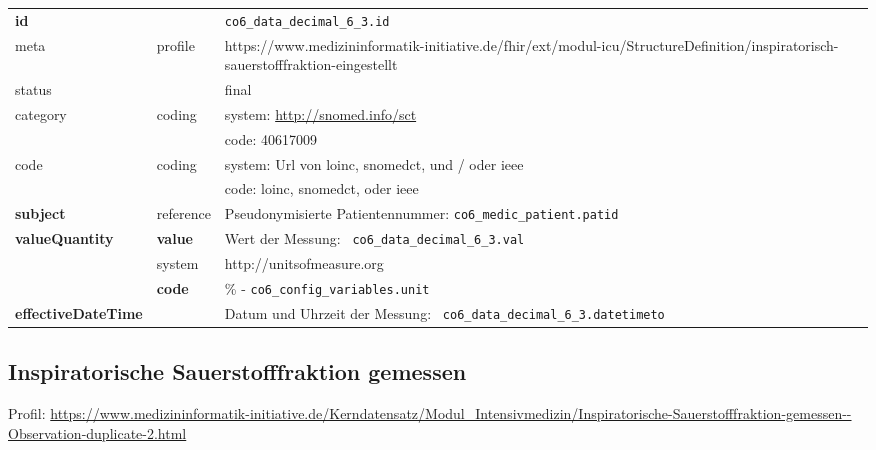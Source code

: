 \begin{longtable}{|l|l|p{7.5cm}|}
	\hline
	\rowcolor{lightgray} \multicolumn{3}{|l|}{Data Mapping (inhaltlich)} \\ \hline
	\textbf{id} &  & \texttt{co6\_data\_decimal\_6\_3.id} \\ \hline
	meta & profile & https://www.medizininformatik-initiative.de/fhir/ext/modul-icu/StructureDefinition/inspiratorisch-sauerstofffraktion-eingestellt \\ \hline 
	status &  & final   \\ \hline 
	category & coding & system: \url{http://snomed.info/sct} \\
	\cline{3-3}
	& & code: 40617009 \\ \hline
	code & coding & system: Url von \ac{loinc}, \ac{snomedct}, und / oder \ac{ieee} \\ 
	\cline{3-3} 
	&  & code: \ac{loinc}, \ac{snomedct}, oder \ac{ieee} \\ \hline
	\textbf{subject}  & reference & Pseudonymisierte Patientennummer: \texttt{co6\_medic\_patient.patid} \\ \hline
	\textbf{valueQuantity}  & \textbf{value} & Wert der Messung: \texttt{
		co6\_data\_decimal\_6\_3.val} \\
	\cline{2-3}
	& system & http://unitsofmeasure.org \\
	\cline{2-3}
	& \textbf{code} & \% - \texttt{co6\_config\_variables.unit}
	\\ \hline
	\textbf{effectiveDateTime}  & & Datum und Uhrzeit der Messung: \texttt{
		co6\_data\_decimal\_6\_3.datetimeto} \\
	\hline
\end{longtable}

\subsection{Inspiratorische Sauerstofffraktion gemessen} 

Profil: \url{https://www.medizininformatik-initiative.de/Kerndatensatz/Modul_Intensivmedizin/Inspiratorische-Sauerstofffraktion-gemessen--Observation-duplicate-2.html}

